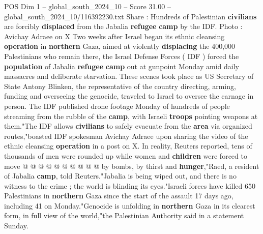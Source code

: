 \begin{textsample}{POS Dim 1 – global\_south\_2024\_10 – Score 31.00 – global\_south\_2024\_10/116392230.txt}  \label{ex:f1_pos_169}
Share : Hundreds of Palestinian \textbf{civilians} are forcibly \textbf{displaced} from the Jabalia \textbf{refugee} \textbf{camp} by the IDF.
Photo : Avichay Adraee on X Two weeks after Israel began its ethnic cleansing \textbf{operation} in \textbf{northern} Gaza, aimed at violently \textbf{displacing} the 400,000 Palestinians who remain there, the Israel Defense Forces ( IDF ) forced the \textbf{population} of Jabalia \textbf{refugee} \textbf{camp} out at gunpoint Monday amid daily massacres and deliberate starvation.
These scenes took place as US Secretary of State Antony Blinken, the representative of the country directing, arming, funding and overseeing the genocide, traveled to Israel to oversee the carnage in person.
The IDF published drone footage Monday of hundreds of people streaming from the rubble of the \textbf{camp}, with Israeli \textbf{troops} pointing weapons at them."The IDF allows \textbf{civilians} to safely evacuate from the \textbf{area} via organized routes,"boasted IDF spokesman Avichay Adraee upon sharing the video of the ethnic cleansing \textbf{operation} in a post on X.
In reality, Reuters reported, tens of thousands of men were rounded up while women and \textbf{children} were forced to move @ @ @ @ @ @ @ @ @ @ by bombs, by thirst and \textbf{hunger},"Raed, a resident of Jabalia \textbf{camp}, told Reuters."Jabalia is being wiped out, and there is no witness to the crime ; the world is blinding its eyes."Israeli forces have killed 650 Palestinians in \textbf{northern} Gaza since the start of the assault 17 days ago, including 41 on Monday."Genocide is unfolding in \textbf{northern} Gaza in its clearest form, in full view of the world,"the Palestinian Authority said in a statement Sunday.

\end{textsample}
